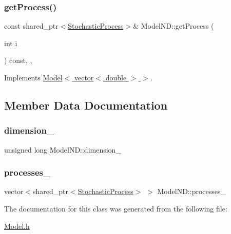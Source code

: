 \subsubsection{\texorpdfstring{get\+Process()}{getProcess()}\hspace{0.1cm}{\footnotesize\ttfamily [2/2]}}
{\footnotesize\ttfamily const shared\+\_\+ptr$<$\hyperlink{class_stochastic_process}{Stochastic\+Process}$>$\& Model\+N\+D\+::get\+Process (\begin{DoxyParamCaption}\item[{int}]{i }\end{DoxyParamCaption}) const\hspace{0.3cm}{\ttfamily [inline]}, {\ttfamily [override]}, {\ttfamily [virtual]}}



Implements \hyperlink{class_model_a7b9e58a51a5d244aa7012f1cdb7aebd8}{Model$<$ vector$<$ double $>$ $>$}.



\subsection{Member Data Documentation}
\hypertarget{class_model_n_d_ac86872437daeeffeb8fb1b387bea28f8}{}\label{class_model_n_d_ac86872437daeeffeb8fb1b387bea28f8} 
\subsubsection{\texorpdfstring{dimension\+\_\+}{dimension\_}}
{\footnotesize\ttfamily unsigned long Model\+N\+D\+::dimension\+\_\+\hspace{0.3cm}{\ttfamily [protected]}}

\hypertarget{class_model_n_d_ab25eac0a332967200b9d247c9a58572f}{}\label{class_model_n_d_ab25eac0a332967200b9d247c9a58572f} 
\subsubsection{\texorpdfstring{processes\+\_\+}{processes\_}}
{\footnotesize\ttfamily vector$<$shared\+\_\+ptr$<$\hyperlink{class_stochastic_process}{Stochastic\+Process}$>$ $>$ Model\+N\+D\+::processes\+\_\+\hspace{0.3cm}{\ttfamily [protected]}}



The documentation for this class was generated from the following file\+:\begin{DoxyCompactItemize}
\item 
\hyperlink{_model_8h}{Model.\+h}\end{DoxyCompactItemize}
